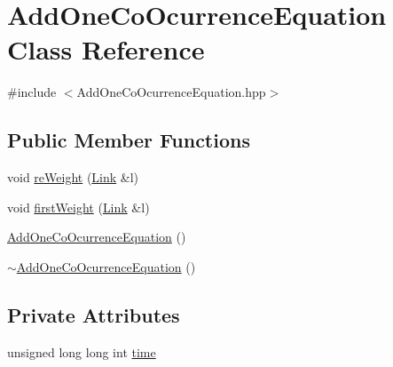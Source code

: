 \hypertarget{class_add_one_co_ocurrence_equation}{\section{Add\+One\+Co\+Ocurrence\+Equation Class Reference}
\label{class_add_one_co_ocurrence_equation}
}


{\ttfamily \#include $<$Add\+One\+Co\+Ocurrence\+Equation.\+hpp$>$}

\subsection*{Public Member Functions}
\begin{DoxyCompactItemize}
\item 
void \hyperlink{class_add_one_co_ocurrence_equation_a007ae66c083ed03425b8470e827c0d5e}{re\+Weight} (\hyperlink{class_link}{Link} \&l)
\item 
void \hyperlink{class_add_one_co_ocurrence_equation_adc35f9322353d3c7c7748aa68122f880}{first\+Weight} (\hyperlink{class_link}{Link} \&l)
\item 
\hyperlink{class_add_one_co_ocurrence_equation_a13fb88aa8f85bbed226e660cfdb4108c}{Add\+One\+Co\+Ocurrence\+Equation} ()
\item 
\hyperlink{class_add_one_co_ocurrence_equation_aef4986b76639a232182fde519b18a6f6}{$\sim$\+Add\+One\+Co\+Ocurrence\+Equation} ()
\end{DoxyCompactItemize}
\subsection*{Private Attributes}
\begin{DoxyCompactItemize}
\item 
unsigned long long int \hyperlink{class_add_one_co_ocurrence_equation_acc5d13016d7aad2a3937d31552058997}{time}
\end{DoxyCompactItemize}


